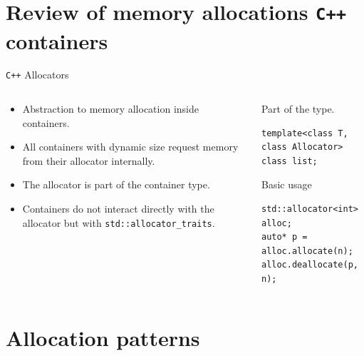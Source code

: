 \documentclass[10pt,aspectratio=169]{beamer}
\begin{document}
\section{Review of memory allocations \texttt{C++} containers}
\begin{frame}[fragile]{\texttt{C++} Allocators}
\begin{columns}
\begin{column}{0.5\textwidth}
\begin{itemize}
\item Abstraction to memory allocation inside containers.
\item All containers with dynamic size request memory from
their allocator internally.
\item The allocator is part of the container type.
\item Containers do not interact directly with the allocator but with
\texttt{std::allocator\_traits}.
\end{itemize}
\end{column}

\begin{column}{0.5\textwidth}
Part of the type.
\begin{lstlisting}
template<class T, class Allocator>
class list;
\end{lstlisting}

Basic usage
\begin{lstlisting}
std::allocator<int> alloc;
auto* p = alloc.allocate(n);
alloc.deallocate(p, n);
\end{lstlisting}
\end{column}
\end{columns}
\end{frame}

\section{Allocation patterns}
\end{document}
